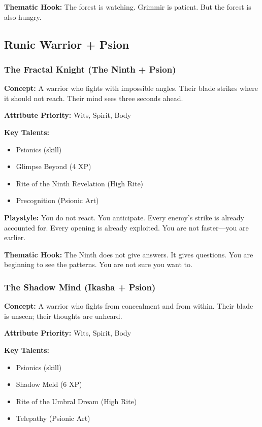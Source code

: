 \textbf{Thematic Hook:} The forest is watching. Grimmir is patient. But the forest is also hungry.

\subsection{Runic Warrior + Psion}

\subsubsection{The Fractal Knight (The Ninth + Psion)}

\textbf{Concept:} A warrior who fights with impossible angles. Their blade strikes where it should not reach. Their mind sees three seconds ahead.

\textbf{Attribute Priority:} Wits, Spirit, Body

\textbf{Key Talents:}
\begin{itemize}
\item Psionics (skill)
\item Glimpse Beyond (4 XP)
\item Rite of the Ninth Revelation (High Rite)
\item Precognition (Psionic Art)
\end{itemize}

\textbf{Playstyle:} You do not react. You anticipate. Every enemy's strike is already accounted for. Every opening is already exploited. You are not faster—you are earlier.

\textbf{Thematic Hook:} The Ninth does not give answers. It gives questions. You are beginning to see the patterns. You are not sure you want to.

\subsubsection{The Shadow Mind (Ikasha + Psion)}

\textbf{Concept:} A warrior who fights from concealment and from within. Their blade is unseen; their thoughts are unheard.

\textbf{Attribute Priority:} Wits, Spirit, Body

\textbf{Key Talents:}
\begin{itemize}
\item Psionics (skill)
\item Shadow Meld (6 XP)
\item Rite of the Umbral Dream (High Rite)
\item Telepathy (Psionic Art)
\end{itemize}

